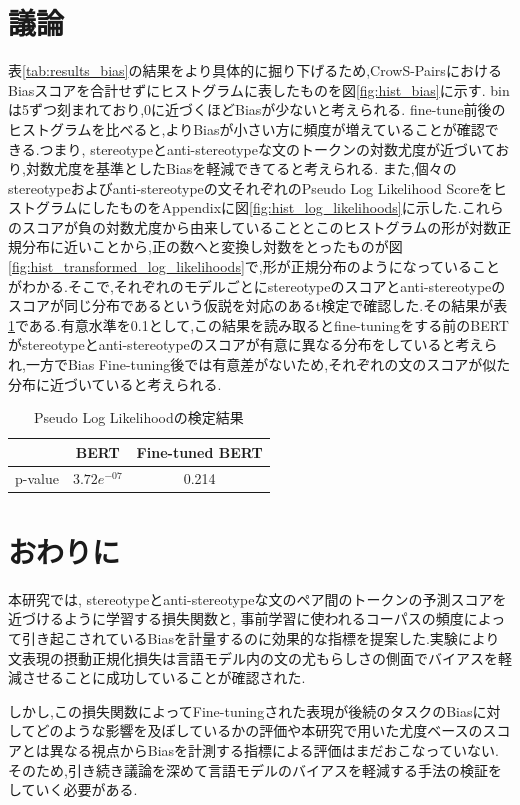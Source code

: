 \documentclass[
  platex, dvipdfmx %
]{nlp2021}
\begin{document}
\section{議論}
表\ref{tab:results_bias}の結果をより具体的に掘り下げるため,CrowS-PairsにおけるBiasスコアを合計せずにヒストグラムに表したものを図\ref{fig:hist_bias}に示す. binは5ずつ刻まれており,0に近づくほどBiasが少ないと考えられる. fine-tune前後のヒストグラムを比べると,よりBiasが小さい方に頻度が増えていることが確認できる.つまり, stereotypeとanti-stereotypeな文のトークンの対数尤度が近づいており,対数尤度を基準としたBiasを軽減できてると考えられる.
また,個々のstereotypeおよびanti-stereotypeの文それぞれのPseudo Log Likelihood ScoreをヒストグラムにしたものをAppendixに図\ref{fig:hist_log_likelihoods}に示した.これらのスコアが負の対数尤度から由来していることとこのヒストグラムの形が対数正規分布に近いことから,正の数へと変換し対数をとったものが図\ref{fig:hist_transformed_log_likelihoods}で,形が正規分布のようになっていることがわかる.そこで,それぞれのモデルごとにstereotypeのスコアとanti-stereotypeのスコアが同じ分布であるという仮説を対応のあるt検定で確認した.その結果が表\ref{tab:t_bias_scores}である.有意水準を0.1として,この結果を読み取るとfine-tuningをする前のBERTがstereotypeとanti-stereotypeのスコアが有意に異なる分布をしていると考えられ,一方でBias Fine-tuning後では有意差がないため,それぞれの文のスコアが似た分布に近づいていると考えられる.

\begin{table}[h]
\centering
\caption{Pseudo Log Likelihoodの検定結果}
\label{tab:t_bias_scores}
\begin{tabular}{lcc}
\hline
 &  BERT & Fine-tuned BERT \\
\hline
p-value & $3.72e^{-07}$ &  0.214 \\
\hline
\end{tabular}
\end{table}

\section{おわりに}
本研究では, stereotypeとanti-stereotypeな文のペア間のトークンの予測スコアを近づけるように学習する損失関数と, 事前学習に使われるコーパスの頻度によって引き起こされているBiasを計量するのに効果的な指標を提案した.実験により文表現の摂動正規化損失は言語モデル内の文の尤もらしさの側面でバイアスを軽減させることに成功していることが確認された.

しかし,この損失関数によってFine-tuningされた表現が後続のタスクのBiasに対してどのような影響を及ぼしているかの評価や本研究で用いた尤度ベースのスコアとは異なる視点からBiasを計測する指標による評価はまだおこなっていない.そのため,引き続き議論を深めて言語モデルのバイアスを軽減する手法の検証をしていく必要がある.
\end{document}
